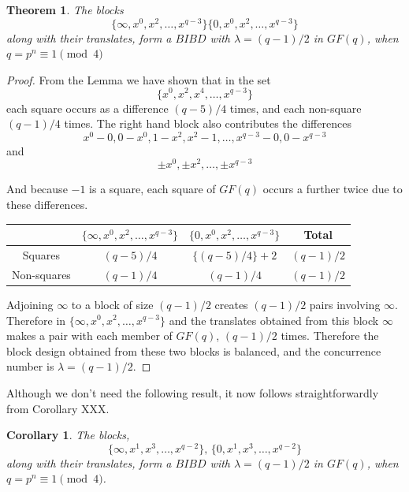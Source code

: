 \documentclass[11pt, a4paper]{book}\usepackage[]{graphicx}\usepackage[]{xcolor}
\newtheorem{theorem}{Theorem}
\newtheorem{corollary}{Corollary}[theorem]
\begin{document}
\begin{theorem}
The blocks
\begin{equation}
\{\infty, x^0, x^2, \ldots, x^{q - 3}\}\{0, x^0, x^2, \ldots, x^{q - 3}\}
\end{equation}
along with their translates, form a $BIBD$ with
$\lambda = (q - 1)/2$ in $GF(q)$, when
$q = p^n \equiv 1\pmod 4$
\end{theorem}
\begin{proof}
From the Lemma we have shown that in the set
\begin{equation}
\{x^0, x^2, x^4, \ldots, x^{q - 3}\}
\end{equation}
each square occurs as a difference
$(q - 5)/4$ times, and each non-square $(q-1)/4$ times.
The right hand block also contributes the differences
\begin{equation}
x^0 - 0, 0 - x^0, 1 - x^2, x^2 - 1, \ldots, x^{q - 3} - 0, 0 - x^{q - 3}
\end{equation}
and
\begin{equation}
\pm x^0, \pm x^2, \ldots ,\pm x^{q - 3}
\end{equation}

And because $-1$ is a square, each square of $GF(q)$ occurs
a further twice due to these differences.

\begin{center}
\begin{tabular}{c|ccc}
               & $\{\infty, x^0, x^2, \ldots, x^{q - 3}\}$ & $\{0, x^0, x^2, \ldots,x^{q - 3}\}$ &   Total     \\ \hline
     Squares   &               $(q - 5)/4$                 &         $\{(q - 5)/4\} + 2$         & $(q - 1)/2$ \\
   Non-squares &               $(q - 1)/4$                 &              $(q - 1)/4$            & $(q - 1)/2$ \\
\end{tabular}
\end{center}

Adjoining $\infty$ to a block of size $(q - 1)/2$ creates
$(q - 1)/2$ pairs involving $\infty$. Therefore in
$\{\infty, x^0, x^2, \ldots, x^{q - 3}\}$ and the translates
obtained from this block $\infty$ makes a pair with each
member of $GF(q)$, $(q - 1)/2$ times.  Therefore the block
design obtained from these two blocks is balanced, and the
concurrence number is $\lambda = (q - 1)/2$.
\end{proof}

Although we don’t need the following result, it now follows
straightforwardly from Corollary XXX.
\begin{corollary}
The blocks,
\begin{equation}
\{\infty, x^1, x^3, \ldots, x^{q - 2}\},\, \{0, x^1, x^3, \ldots, x^{q - 2}\}
\end{equation}
along with their translates, form a $BIBD$ with
$\lambda = (q - 1)/2$ in $GF(q)$, when
$q = p^n \equiv 1\pmod 4$.
\end{corollary}
\end{document}
